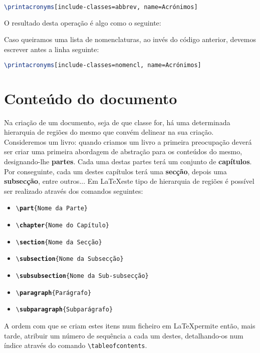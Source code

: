 \documentclass[a4paper, onecolumn, 10pt]{report}
\begin{document}
\begin{lstlisting}[language=TeX]
\printacronyms[include-classes=abbrev, name=Acrónimos]
\end{lstlisting}

O resultado desta operação é algo como o seguinte:

\printacronyms[include-classes=abbrev, name=Acrónimos]

Caso queiramos uma lista de nomenclaturas, ao invés do código anterior, devemos escrever antes a linha seguinte:

\begin{lstlisting}[language=TeX]
\printacronyms[include-classes=nomencl, name=Acrónimos]
\end{lstlisting}

\section{Conteúdo do documento} \label{cont-of-doc}
Na criação de um documento, seja de que classe for, há uma determinada hierarquia de regiões do mesmo que convém delinear na sua criação. Consideremos um livro:
quando criamos um livro a primeira preocupação deverá ser criar uma primeira abordagem de abstração para os conteúdos do mesmo, designando-lhe \textbf{partes}.
Cada uma destas partes terá um conjunto de \textbf{capítulos}. Por conseguinte, cada um destes capítulos terá uma \textbf{secção}, depois uma \textbf{subsecção},
entre outros... Em \LaTeX este tipo de hierarquia de regiões é possível ser realizado através dos comandos seguintes:

\begin{itemize}
    \item \texttt{\textbackslash \textbf{part}\{Nome da Parte\}}
    \item \texttt{\textbackslash \textbf{chapter}\{Nome do Capítulo\}}
    \item \texttt{\textbackslash \textbf{section}\{Nome da Secção\}}
    \item \texttt{\textbackslash \textbf{subsection}\{Nome da Subsecção\}}
    \item \texttt{\textbackslash \textbf{subsubsection}\{Nome da Sub-subsecção\}}
    \item \texttt{\textbackslash \textbf{paragraph}\{Parágrafo\}}
    \item \texttt{\textbackslash \textbf{subparagraph}\{Subparágrafo\}}
\end{itemize}

A ordem com que se criam estes itens num ficheiro em \LaTeX permite então, mais tarde, atribuir um número de sequência a cada um destes, detalhando-os
num índice através do comando \texttt{\textbackslash tableofcontents}.
\end{document}
